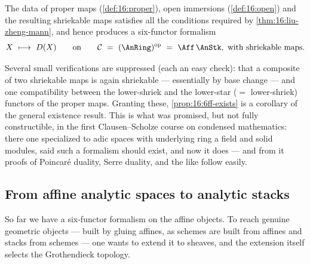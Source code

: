 \begin{proposition}
\label{prop:16:6ff-exists}
The data of proper maps (\cref{def:16:proper}), open immersions (\cref{def:16:open}) and
the resulting shriekable maps satisfies all the conditions required by
\cref{thm:16:liu-zheng-mann}, and hence produces a six-functor formalism
\begin{equation*}
X\ \longmapsto\ D(X)\qquad\text{on}\qquad \mathcal C\ =\ (\AnRing)^{\mathrm{op}}\ =\ \Aff\,\AnStk,\ \text{with shriekable maps.}
\end{equation*}
\end{proposition}

\begin{remark}
\label{rmk:16:small-checks}
Several small verifications are suppressed (each an easy check): that a composite of two
shriekable maps is again shriekable --- essentially by base change --- and one
compatibility between the lower-shriek and the lower-star ($=$ lower-shriek) functors of
the proper maps. Granting these, \cref{prop:16:6ff-exists} is a corollary of the general
existence result. This is what was promised, but not fully constructible, in the first
Clausen--Scholze course on condensed mathematics: there one specialized to adic spaces
with underlying ring a field and solid modules, said such a formalism should exist, and
now it does --- and from it proofs of Poincar\'e duality, Serre duality, and the like
follow easily.
\end{remark}

\subsection{From affine analytic spaces to analytic stacks}
\label{subsec:16:topology}

So far we have a six-functor formalism on the affine objects. To reach genuine
geometric objects --- built by gluing affines, as schemes are built from affines and
stacks from schemes --- one wants to extend it to sheaves, and the extension itself
selects the Grothendieck topology.

